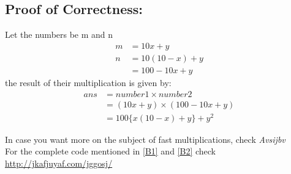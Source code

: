 \documentclass[11pt, a4paper]{article}
\begin{document}
	\subsection{Proof of Correctness:\label{C2}\\}
	Let the numbers be m and n
	\begin{align*}
		m &= 10x+y\\
		n &= 10(10-x)+y\\
				&= 100 - 10x +y
	\end{align*}
	the result of their multiplication is given by:\\
	\begin{align*}
		ans &= number1 \times number2\\
				&= (10x+y) \times (100 - 10x + y)\\
				&= 100\{x(10-x)+y\} + y^2
	\end{align*}
	
	
	\newpage
	\vspace{0.5cm}
	\hspace{-0.7cm}
	In case you want more on the subject of fast multiplications, check \textit{Avsijbv}
	\cite{cite1}\\
	For the complete code mentioned in \ref{B1} and \ref{B2} check \url{http://jkafjuyaf.com/jggosj/}
	
	
	
\end{document}
